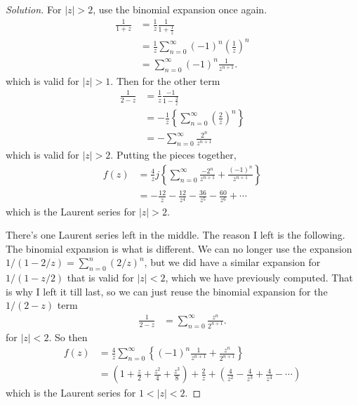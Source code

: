\begin{proof}[Solution]
    For $|z|>2$,
    use the binomial expansion once again.
    \begin{align}
        \frac{1}{1 + z} &=
        \frac{1}{z} \frac{1}{1 + \frac{1}{z}}\\
        &= \frac{1}{z} \sum_{n=0}^{\infty} (-1)^n \left(
        \frac{1}{z}
        \right)^n\\
        &= \sum_{n=0}^{\infty}(-1)^{n} \frac{1}{z^{n+1}}.
    \end{align}
    which is valid for $|z| > 1$.
    Then for the other term
    \begin{align}
        \frac{1}{2 - z} &=
        \frac{1}{z} \frac{-1}{1 - \frac{2}{z}}\\
        &= -\frac{1}{z}\left\{
        \sum_{n=0}^{\infty}\left(\frac{2}{z} \right)^n
        \right\}\\
        &= -\sum_{n=0}^{\infty}\frac{2^n}{z^{n+1}}
    \end{align}
    which is valid for $|z|>2$.
    Putting the pieces together,
    \begin{align}
        f(z) &=
        \frac{4}{z}j\left\{ 
        \sum_{n=0}^{\infty} \frac{-2^{n}}{z^{n+1}}
        + \frac{(-1)^n}{z^{n+1}}
        \right\}\\
        &= -\frac{12}{z} - \frac{12}{z^4} - \frac{36}{z^5} -
        \frac{60}{z^6} + \cdots
    \end{align}
    which is the Laurent series for $|z|>2$.

    There's one Laurent series left in the middle.
    The reason I left is the following.
    The binomial expansion is what is different.
    We can no longer use the expansion $1/(1 - 2/z)=\sum_{n=0}^n(2/z)^n$,
    but we did have a similar expansion for $1/(1 - z/2)$ that is valid for
    $|z|<2$, which we have previously computed.
    That is why I left it till last, 
    so we can just reuse the binomial expansion for the $1/(2 - z)$ term
    \begin{align}
        \frac{1}{2 - z} &= \sum_{n=0}^{\infty}\frac{z^n}{2^{n+1}}.
    \end{align}
    for $|z|<2$.
    So then
    \begin{align}
        f(z) &= \frac{4}{z}\sum_{n=0}^{\infty}\left\{
            (-1)^n \frac{1}{z^{n+1}}
            + \frac{z^n}{2^{n+1}}
        \right\}\\
        &= \left(
            1 + \frac{z}{2} + \frac{z^2}{4} + \frac{z^3}{8}
        \right)
        + \frac{2}{z}
        + \left(
        \frac{4}{z^2} - \frac{4}{z^3} + \frac{4}{z^4} - \cdots
        \right)
    \end{align}
    which is the Laurent series for $1 < |z| < 2$.
\end{proof}

